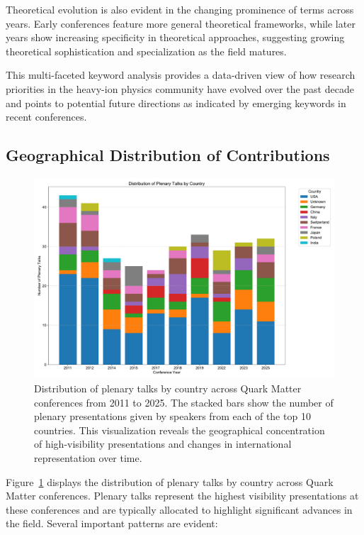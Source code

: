 \documentclass[a4paper,11pt]{article}
\begin{document}
Theoretical evolution is also evident in the changing prominence of terms across years. Early conferences feature more general theoretical frameworks, while later years show increasing specificity in theoretical approaches, suggesting growing theoretical sophistication and specialization as the field matures.

This multi-faceted keyword analysis provides a data-driven view of how research priorities in the heavy-ion physics community have evolved over the past decade and points to potential future directions as indicated by emerging keywords in recent conferences.

\subsection{Geographical Distribution of Contributions}

\begin{figure}[H]
\centering
\includegraphics[width=\textwidth]{figures/plenary_talks_by_country.pdf}
\caption{Distribution of plenary talks by country across Quark Matter conferences from 2011 to 2025. The stacked bars show the number of plenary presentations given by speakers from each of the top 10 countries. This visualization reveals the geographical concentration of high-visibility presentations and changes in international representation over time.}
\label{fig:country_plenary}
\end{figure}

Figure~\ref{fig:country_plenary} displays the distribution of plenary talks by country across Quark Matter conferences. Plenary talks represent the highest visibility presentations at these conferences and are typically allocated to highlight significant advances in the field. Several important patterns are evident:
\end{document}
